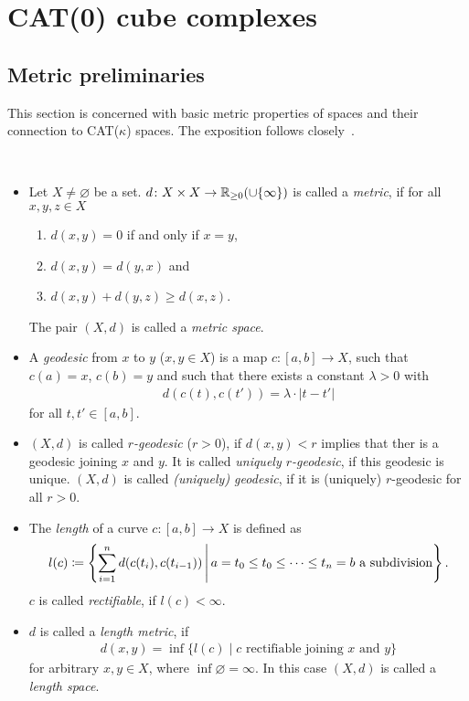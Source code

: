 \section{CAT(0) cube complexes}
\label{sec:complexes}

\subsection{Metric preliminaries}
\label{sec:metric}
This section is concerned with basic metric properties of spaces and their connection to CAT(\(\kappa\)) spaces. The exposition follows closely~\cite{MR1744486}.

\begin{defin}~
  \begin{itemize}
  \item Let \(X\neq \varnothing\) be a set. \(d\colon X \times X \to \mathbb{R}_{\geq 0} (\cup \{\infty\})\) is called a \emph{metric}, if for all \(x,y,z \in X\)
    \begin{enumerate}
    \item \(d(x,y) = 0\) if and only if \(x = y\),
    \item \(d(x,y) = d(y,x)\) and
    \item \(d(x,y) + d(y,z) \geq d(x,z)\).
    \end{enumerate}
    The pair \((X,d)\) is called a \emph{metric space}.
  \item A \emph{geodesic} from \(x\) to \(y\) (\(x,y \in X\)) is a map \(c\colon [a,b] \to X\), such that \(c(a) = x\), \(c(b) = y\) and such that there exists a constant \(\lambda > 0\) with
    \begin{align*}
      d(c(t), c(t')) = \lambda \cdot |t - t'| 
    \end{align*}
    for all \(t,t' \in [a,b]\).
  \item \((X,d)\) is called \emph{\(r\)-geodesic} (\(r > 0\)), if \(d(x,y) < r\) implies that ther is a geodesic joining \(x\) and \(y\). It is called \emph{uniquely \(r\)-geodesic}, if this geodesic is unique. \((X,d)\) is called \emph{(uniquely) geodesic}, if it is (uniquely) \(r\)-geodesic for all \(r > 0\).
  \item The \emph{length} of a curve \(c\colon [a,b] \to X\) is defined as
    \begin{align*}
      l(c) \coloneqq \left\{\sum_{i=1}^n d(c(t_i), c(t_{i-1})) \,\middle|\, a = t_0 \leq t_0 \leq \dots \leq t_n = b \text{ a subdivision} \right\}.
    \end{align*}
    \(c\) is called \emph{rectifiable}, if \(l(c) < \infty\).
  \item \(d\) is called a \emph{length metric}, if
    \begin{align*}
      d(x,y) = \inf \{l(c) \mid c \text{ rectifiable joining } x \text{ and } y\}
    \end{align*}
    for arbitrary \(x,y \in X\), where \(\inf\varnothing = \infty\). In this case \((X,d)\) is called a \emph{length space}.
  \end{itemize}
\end{defin}

